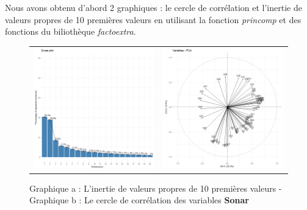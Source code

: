 \documentclass[a4paper,11pt,oneside,roman]{article}
\begin{document}
Nous avons obtenu d'abord 2 graphiques : le cercle de corrélation et l'inertie de valeurs propres de 10 premières valeurs en utilisant la fonction \textit{princomp} et des fonctions du biliothèque \textit{factoextra}.
\begin{figure}[htb]
    \centering
    \begin{tabular}{c|c}
    \includegraphics[scale = .3]{./discrimination/Sonar/eig_plot.png} &
    \includegraphics[scale = .3]{discrimination/Sonar/var_plot.png}
    \end{tabular}
    \caption{Graphique a : L'inertie de valeurs propres de 10 premières valeurs - Graphique b : Le cercle de corrélation des variables \textbf{Sonar}}
    \label{fig:my_label}
\end{figure}
\end{document}
